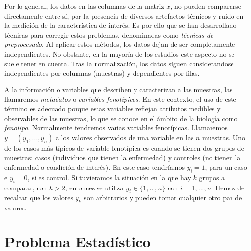 Por lo general, los datos en las columnas de la matriz $x$, no pueden compararse directamente entre sí, por la presencia
de diversos artefactos técnicos y ruido en la medición de la característica de interés. Es por ello que se han desarrollado
técnicas para corregir estos problemas, denominadas como \textit{técnicas de preprocesado}. Al aplicar estos métodos, los
datos dejan de ser completamente independientes. No obstante, en la mayoría de los estudios este aspecto no se suele
tener en cuenta. Tras la normalización, los datos siguen considerandose independientes por columnas (muestras) y dependientes
por filas. \newline

A la información o variables que describen y caracterizan a las muestras, las llamaremos \textit{metadatos} o 
\textit{variables fenotípicas}. En este contexto, el uso de este término es adecuado porque estas variables reflejan
atributos medibles y observables de las muestras, lo que se conoce en el ámbito de la biología como \textit{fenotipo}\cite{phenotype-definition}. 
Normalmente tendremos varias variables fenotípicas. 
Llamaremos $y = (y_{1},...,y_{n})$ a los valores observados de una variable en las $n$ muestras. Uno de los casos más típicos
de variable fenotípica es cuando se tienen dos grupos de muestras: casos (individuos que tienen la enfermedad) y controles
(no tienen la enfermedad o condición de interés). En este caso tendríamos $y_{i} = 1$, para un caso e $y_{i} = 0$, si es control.
Si tuvieramos la situación en la que hay $k$ grupos a comparar, con $k > 2$, entonces se utiliza $y_{i} \in \{1,...,n\}$ 
con $i = 1,...,n$. Hemos de recalcar que los valores $y_{k}$ son arbitrarios y pueden tomar cualquier otro par de valores.\newline




\section{Problema Estadístico}

